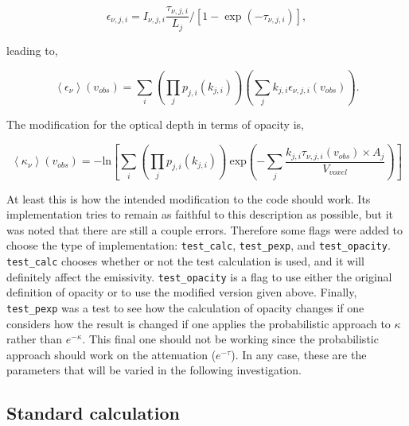 \documentclass[a4paper]{article}
\begin{document}
    \[
    \epsilon_{\nu,j,i} = I_{\nu,j,i} \frac{\tau_{\nu,j,i}} {L_{j}} / [ 1 - \exp(-\tau_{\nu,j,i}) ],
    \]

    leading to,

    \[
    \left< \epsilon_\nu \right> (v_{obs}) = \sum_i \left( \prod_j p_{j,i}(k_{j,i}) \right) \left( \sum_j k_{j,i} \epsilon_{\nu,j,i} (v_{obs}) \right).
    \]

    The modification for the optical depth in terms of opacity is,

    \[
    \left< \kappa_\nu \right> (v_{obs}) = -\mathrm{ln} \left[ \sum_i \left( \prod_j p_{j,i}(k_{j,i}) \right) \ \mathrm{exp} \left( - \sum_j \frac{k_{j,i} \tau_{\nu,j,i} (v_{obs}) \times A_{j}}{V_{voxel}} \right) \right]
    \]

    At least this is how the intended modification to the code should work.
    Its implementation tries to remain as faithful to this description as possible, but it was noted that there are still a couple errors.
    Therefore some flags were added to choose the type of implementation: \texttt{test\_calc}, \texttt{test\_pexp}, and \texttt{test\_opacity}.
    \texttt{test\_calc} chooses whether or not the test calculation is used, and it will definitely affect the emissivity.
    \texttt{test\_opacity} is a flag to use either the original definition of opacity or to use the modified version given above.
    Finally, \texttt{test\_pexp} was a test to see how the calculation of opacity changes if one considers how the result is changed if one applies the probabilistic approach to \(\kappa\) rather than \(e^{-\kappa}\).
    This final one should not be working since the probabilistic approach should work on the attenuation (\(e^{-\tau}\)).
    In any case, these are the parameters that will be varied in the following investigation.

    \subsection{Standard calculation}
\end{document}
